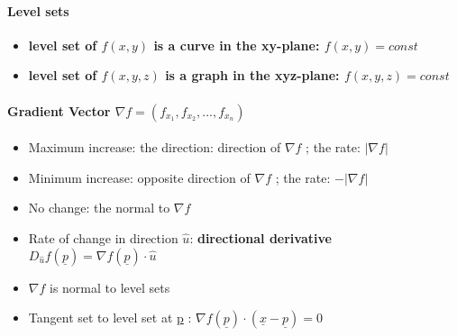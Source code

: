 \documentclass[8pt, twocolumn]{article}
\begin{document}
\paragraph{Level sets}
			\begin{itemize}
				\item \textbf{level set of $f(x, y)$ is a curve in the xy-plane: $f(x, y) = const$}
				\item \textbf{level set of $f(x, y, z)$ is a graph in the xyz-plane: $f(x, y, z) = const$}
			\end{itemize}



\paragraph{Gradient Vector $\nabla f = (f_{x_1}, f_{x_2}, ..., f_{x_n}) $}

	\begin{itemize}
			\item Maximum increase: the direction: direction of $\nabla f$ ; the rate:  $|\nabla f|$
			\item Minimum increase: opposite direction of $\nabla f$ ; the rate:  $- |\nabla f|$
			\item No change: the normal to $\nabla f$
			\item Rate of change in direction $\hat{u}$: \textbf{directional derivative} $D_{\hat{u}}f(\underline{p}) = \nabla f(\underline{p})  \cdot \hat{u}$
			\item $\nabla f$ is normal to level sets 
			\item Tangent set to level set at \underline{p} : $\nabla f(\underline{p})  \cdot (\underline{x} - \underline{p}) = 0$
	\end{itemize} 
\end{document}
